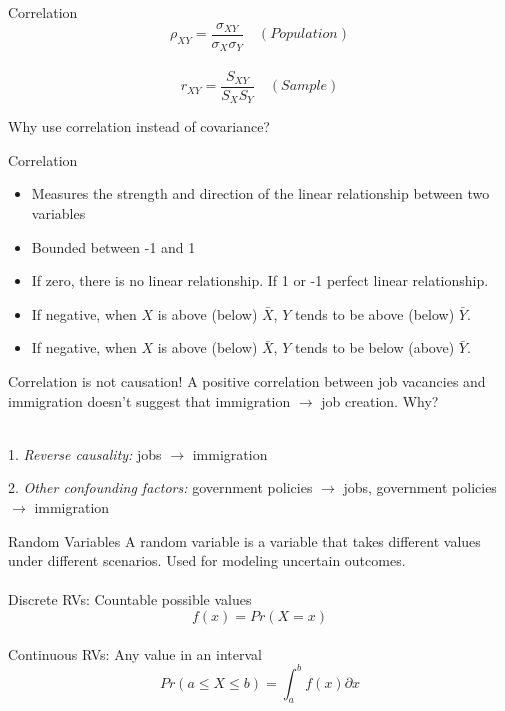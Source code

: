 \documentclass{./../div_teaching_slides}
\begin{document}
\begin{frame}{Correlation}
$$ \rho_{XY} = \frac{ \sigma_{XY}}{\sigma_X \sigma_Y}  \quad (Population) $$ \\
\vspace{1em}
$$ r_{XY} = \frac{ S_{XY}}{S_X S_Y} \quad (Sample) $$

\vspace{1cm}
Why use correlation instead of covariance?
\end{frame}

\begin{frame}{Correlation}
	\begin{itemize}
\item Measures the strength and direction of the linear relationship between two variables
\item Bounded between -1 and 1
\item If zero, there is no linear relationship. If 1 or -1 perfect linear relationship.
\item If negative, when $X$ is above (below) $\bar{X}$, $Y$ tends to be above (below) $\bar{Y}$.
\item If negative, when $X$ is above (below) $\bar{X}$, $Y$ tends to be below (above) $\bar{Y}$.
\end{itemize}
\end{frame}

\begin{frame}{Correlation is not causation!}
A positive correlation between job vacancies and immigration doesn’t
suggest that immigration $\rightarrow$ job creation. Why? \\~\\
\begin{witemize}
\item[1.] \textit{Reverse causality:} jobs $\rightarrow$ immigration
\item[2.] \textit{Other confounding factors:} government policies $\rightarrow$ jobs, government policies $\rightarrow$ immigration   
\end{witemize}
\end{frame}

\begin{frame}{Random Variables}
	A random variable is a variable that takes different values under different scenarios. Used for modeling uncertain outcomes.\\~\\
	Discrete RVs: Countable possible values \\
	$$ f(x) = Pr(X=x) $$ \\
	
\vspace{1em}	
Continuous RVs: Any value in an interval 
$$ Pr(a \leq X \leq b) =  \int_{a}^{b} f(x) \partial x $$
\end{frame}
\end{document}
